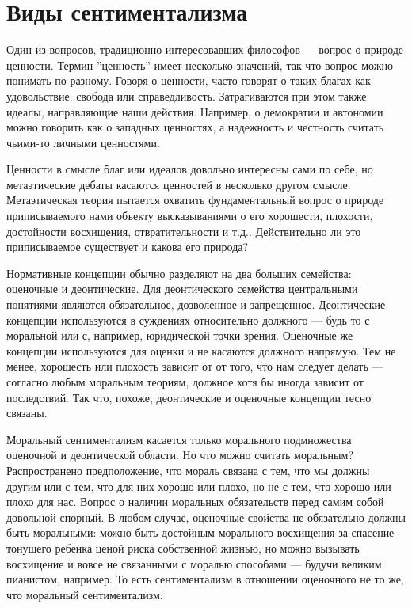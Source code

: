 \documentclass[11pt]{book}
\begin{document}
\section{Виды сентиментализма}

Один из вопросов, традиционно интересовавших философов --- вопрос о природе ценности. Термин ''ценность'' имеет несколько значений, так что вопрос можно понимать по-разному. Говоря о ценности, часто говорят о таких благах как удовольствие, свобода или справедливость. Затрагиваются при этом также идеалы, направляющие наши действия. Например, о демократии и автономии можно говорить как о западных ценностях, а надежность и честность считать чьими-то личными ценностями.

Ценности в смысле благ или идеалов довольно интересны сами по себе, но метаэтические дебаты касаются ценностей в несколько другом смысле. Метаэтическая теория пытается охватить фундаментальный вопрос о природе приписываемого нами объекту высказываниями о его хорошести, плохости, достойности восхищения, отвратительности и т.д.. Действительно ли это приписываемое существует и какова его природа?

Нормативные концепции обычно разделяют на два больших семейства: оценочные и деонтические. Для деонтического семейства центральными понятиями являются обязательное, дозволенное и запрещенное. Деонтические концепции используются в суждениях относительно должного --- будь то с моральной или с, например, юридической точки зрения. Оценочные же концепции используются для оценки и не касаются должного напрямую. Тем не менее, хорошесть или плохость зависит от от того, что нам следует делать --- согласно любым моральным теориям, должное хотя бы иногда зависит от последствий. Так что, похоже, деонтические и оценочные концепции тесно связаны.

Моральный сентиментализм касается только морального подмножества оценочной и деонтической области. Но что можно считать моральным? Распространено предположение, что мораль связана с тем, что мы должны другим или с тем, что для них хорошо или плохо, но не с тем, что хорошо или плохо для нас. Вопрос о наличии моральных обязательств перед самим собой довольной спорный. В любом случае, оценочные свойства не обязательно должны быть моральными: можно быть достойным морального восхищения за спасение тонущего ребенка ценой риска собственной жизнью, но можно вызывать восхищение и вовсе не связанными с моралью способами --- будучи великим пианистом, например. То есть сентиментализм в отношении оценочного не то же, что моральный сентиментализм.
\end{document}

